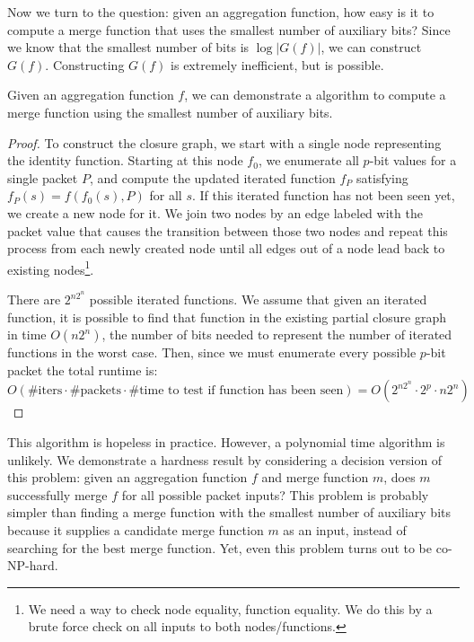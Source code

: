 Now we turn to the question: given an aggregation function, how easy is it to
compute a merge function that uses the smallest number of auxiliary bits?
Since we know that the smallest number of bits is $\log |G(f)|$, we can
construct $G(f)$. Constructing $G(f)$ is extremely inefficient, but is
possible.

\begin{theorem}
Given an aggregation function $f$, we can demonstrate a algorithm to compute a merge function using the smallest number of auxiliary bits.
\end{theorem}
\begin{proof}
To construct the closure graph, we start with a single node representing the
identity function. Starting at this node $f_0$, we enumerate all $p$-bit values
for a single packet $P$, and compute the updated iterated function $f_P$
satisfying $f_P(s) = f(f_0(s), P)$ for all $s$.  If this iterated function has
not been seen yet, we create a new node for it.  We join two nodes by an edge
labeled with the packet value that causes the transition between those two
nodes and repeat this process from each newly created node until all edges out
of a node lead back to existing nodes\footnote{We need a way to check node
equality, \ie function equality. We do this by a brute force check on all
inputs to both nodes/functions.}.

There are $2^{n2^n}$ possible iterated functions. We assume that given an iterated function,
it is possible to find that function in the existing partial closure graph in time $O(n2^n)$,
the number of bits needed to represent the number of iterated functions in the worst case.
Then, since we must enumerate every possible $p$-bit packet the total runtime is:
\[ O(\text{\# iters} \cdot \text{\# packets} \cdot \text{\# time to test if function has been seen}) =  O\left(2^{n2^n} \cdot 2^p \cdot n2^n\right) \]
\end{proof}

This algorithm is hopeless in practice. However, a polynomial time algorithm is
unlikely.  We demonstrate a hardness result by considering a decision version
of this problem: given an aggregation function $f$ and merge function $m$, does
$m$ successfully merge $f$ for all possible packet inputs?  This problem is
probably simpler than finding a merge function with the smallest number of
auxiliary bits because it supplies a candidate merge function $m$ as an input,
instead of searching for the best merge function.  Yet, even this problem turns
out to be co-NP-hard.

